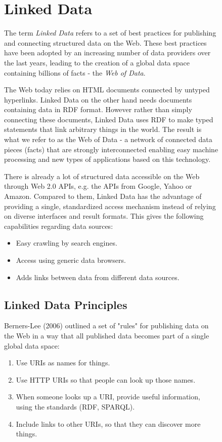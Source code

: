 \begin{figure}[h!]
\section{Linked Data}

The term \textit{Linked Data} refers to a set of best practices for publishing and connecting
structured data on the Web. These best practices have been adopted by an increasing number of data providers over the last years, leading to the creation of a global data space containing billions of facts - the \textit{Web of Data}. 

The Web today relies on HTML documents connected by untyped hyperlinks. Linked Data on the other hand needs documents containing data in RDF format. However rather than simply connecting these documents, Linked Data uses RDF to make typed statements that link arbitrary things in the world. The result is what we refer to as the
Web of Data - a network of connected data pieces (facts) that are strongly interconnected enabling easy machine processing and new types of applications based on this technology.

There is already a lot of structured data accessible on the Web through Web 2.0 APIs, e.g. the APIs from Google, Yahoo or Amazon. Compared to them, Linked Data has the advantage of providing a single, standardized access mechanism instead of relying on diverse interfaces and result formats. This gives the following capabilities regarding data sources:

\begin{itemize}
    \item Easy crawling by search engines.
    \item Access using generic data browsers.
    \item Adds links between data from different data sources.
\end{itemize}

\subsection{Linked Data Principles}
Berners-Lee (2006) outlined a set of "rules" for publishing data on the Web in a way that all
published data becomes part of a single global data space:
\begin{enumerate}
    \item Use URIs as names for things.
    \item Use HTTP URIs so that people can look up those names.
    \item When someone looks up a URI, provide useful information, using the standards
(RDF, SPARQL).
    \item Include links to other URIs, so that they can discover more things.
\end{enumerate}


\end{figure}
